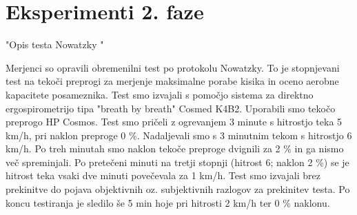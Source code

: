 \section{Eksperimenti 2. faze}
"Opis testa Nowatzky "

Merjenci  so opravili obremenilni test po protokolu Nowatzky. To je stopnjevani test na tekoči preprogi za merjenje maksimalne porabe kisika in oceno aerobne kapacitete  posameznika. Test smo izvajali s pomočjo sistema za direktno ergospirometrijo tipa "breath  by breath" Cosmed K4B2. Uporabili smo  tekočo  preprogo HP Cosmos. Test smo pričeli z ogrevanjem 3 minute s hitrostjo teka 5 km/h, pri naklon preproge 0 \%. Nadaljevali smo s 3 minutnim tekom s hitrostjo 6 km/h. Po treh minutah smo naklon tekoče preproge  dvignili za 2 \% in ga nismo več spreminjali. Po pretečeni minuti na  tretji stopnji (hitrost 6; naklon 2 \%) se je hitrost teka vsaki dve  minuti  povečevala za 1 km/h. Test smo izvajali brez prekinitve do pojava objektivnih oz. subjektivnih razlogov za prekinitev testa. Po koncu testiranja je sledilo še 5 min hoje pri  hitrosti 2 km/h ter 0 \% naklonu.  


